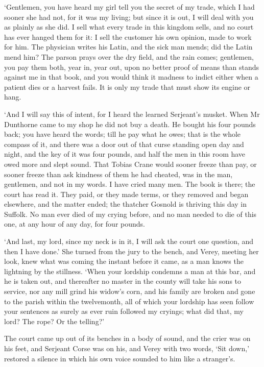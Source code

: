 \documentclass[11pt]{article}
\begin{document}
`Gentlemen, you have heard my girl tell you the secret of my trade, which I had sooner she had not, for it was my living; but since it is out, I will deal with you as plainly as she did. I sell what every trade in this kingdom sells, and no court has ever hanged them for it: I sell the customer his own opinion, made to work for him. The physician writes his Latin, and the sick man mends; did the Latin mend him? The parson prays over the dry field, and the rain comes; gentlemen, you pay them both, year in, year out, upon no better proof of means than stands against me in that book, and you would think it madness to indict either when a patient dies or a harvest fails. It is only my trade that must show its engine or hang.

`And I will say this of intent, for I heard the learned Serjeant's musket. When Mr Dunthorne came to my shop he did not buy a death. He bought his four pounds back; you have heard the words; till he pay what he owes; that is the whole compass of it, and there was a door out of that curse standing open day and night, and the key of it was four pounds, and half the men in this room have owed more and slept sound. That Tobias Crane would sooner freeze than pay, or sooner freeze than ask kindness of them he had cheated, was in the man, gentlemen, and not in my words. I have cried many men. The book is there; the court has read it. They paid, or they made terms, or they removed and began elsewhere, and the matter ended; the thatcher Gosnold is thriving this day in Suffolk. No man ever died of my crying before, and no man needed to die of this one, at any hour of any day, for four pounds.

`And last, my lord, since my neck is in it, I will ask the court one question, and then I have done.' She turned from the jury to the bench, and Verey, meeting her look, knew what was coming the instant before it came, as a man knows the lightning by the stillness. `When your lordship condemns a man at this bar, and he is taken out, and thereafter no master in the county will take his sons to service, nor any mill grind his widow's corn, and his family are broken and gone to the parish within the twelvemonth, all of which your lordship has seen follow your sentences as surely as ever ruin followed my cryings; what did that, my lord? The rope? Or the telling?'

The court came up out of its benches in a body of sound, and the crier was on his feet, and Serjeant Corse was on his, and Verey with two words, `Sit down,' restored a silence in which his own voice sounded to him like a stranger's.
\end{document}

